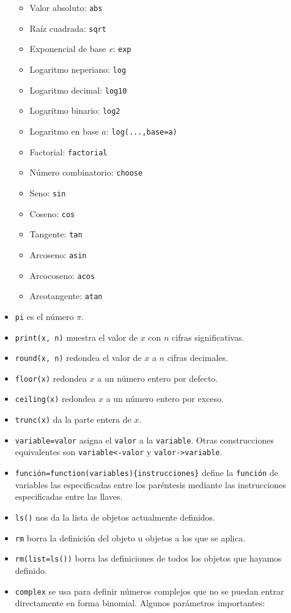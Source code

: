 \documentclass[]{book}
\providecommand{\tightlist}{%
  \setlength{\itemsep}{0pt}\setlength{\parskip}{0pt}}
\theoremstyle{definition}
\theoremstyle{definition}
\theoremstyle{definition}
\theoremstyle{remark}
\begin{document}
\begin{itemize}
  \begin{itemize}
  \tightlist
  \item
    Valor absoluto: \texttt{abs}
  \item
    Raíz cuadrada: \texttt{sqrt}
  \item
    Exponencial de base \emph{e}: \texttt{exp}
  \item
    Logaritmo neperiano: \texttt{log}
  \item
    Logaritmo decimal: \texttt{log10}
  \item
    Logaritmo binario: \texttt{log2}
  \item
    Logaritmo en base \(a\): \texttt{log(...,base=a)}
  \item
    Factorial: \texttt{factorial}
  \item
    Número combinatorio: \texttt{choose}
  \item
    Seno: \texttt{sin}
  \item
    Coseno: \texttt{cos}
  \item
    Tangente: \texttt{tan}
  \item
    Arcoseno: \texttt{asin}
  \item
    Arcocoseno: \texttt{acos}
  \item
    Arcotangente: \texttt{atan}
  \end{itemize}
\item
  \texttt{pi} es el número \(\pi\).
\item
  \texttt{print(x,\ n)} muestra el valor de \(x\) con \(n\) cifras significativas.
\item
  \texttt{round(x,\ n)} redondea el valor de \(x\) a \(n\) cifras decimales.
\item
  \texttt{floor(x)} redondea \(x\) a un número entero por defecto.
\item
  \texttt{ceiling(x)} redondea \(x\) a un número entero por exceso.
\item
  \texttt{trunc(x)} da la parte entera de \(x\).
\item
  \texttt{variable=valor} asigna el \texttt{valor} a la \texttt{variable}. Otras construcciones equivalentes son \texttt{variable\textless{}-valor} y \texttt{valor-\textgreater{}variable}.
\item
  \texttt{función=function(variables)\{instrucciones\}} define la \texttt{función} de variables las especificadas entre los paréntesis mediante las instrucciones especificadas entre las llaves.
\item
  \texttt{ls()} nos da la lista de objetos actualmente definidos.
\item
  \texttt{rm} borra la definición del objeto u objetos a los que se aplica.
\item
  \texttt{rm(list=ls())} borra las definiciones de todos los objetos que hayamos definido.
\item
  \texttt{complex} se usa para definir números complejos que no se puedan entrar directamente en forma binomial. Algunos parámetros importantes:


\end{itemize}
\end{document}
